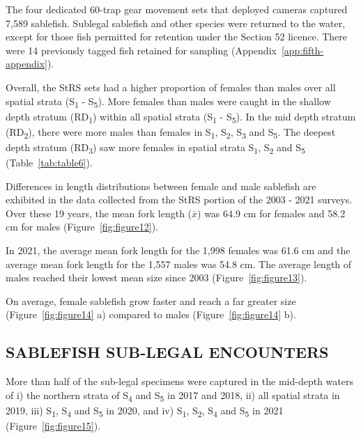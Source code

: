 \documentclass[12pt]{article}\usepackage[]{graphicx}\usepackage[]{color}
\begin{document}
The four dedicated 60-trap gear movement sets that deployed cameras captured 7,589 sablefish. Sublegal sablefish and other species were returned to the water, except for those fish permitted for retention under the Section 52 licence. There were 14 previously tagged fish retained for sampling (Appendix~\ref{app:fifth-appendix}).

Overall, the StRS sets had a higher proportion of females than males over all spatial strata (S\textsubscript{1} - S\textsubscript{5}). More females than males were caught in the shallow depth stratum (RD\textsubscript{1}) within all spatial strata (S\textsubscript{1} - S\textsubscript{5}). In the mid depth stratum (RD\textsubscript{2}), there were more males than females in S\textsubscript{1}, S\textsubscript{2}, S\textsubscript{3} and S\textsubscript{5}. The deepest depth stratum (RD\textsubscript{3}) saw more females in spatial strata S\textsubscript{1}, S\textsubscript{2} and S\textsubscript{5} (Table~\ref{tab:table6}).

Differences in length distributions between female and male sablefish are exhibited in the data collected from the StRS portion of the 2003 - 2021 surveys. Over these 19 years, the mean fork length (\(\bar{x}\)) was 64.9 cm for females and 58.2 cm for males (Figure~\ref{fig:figure12}).

In 2021, the average mean fork length for the 1,998 females was 61.6 cm and the average mean fork length for the 1,557 males was 54.8 cm. The average length of males reached their lowest mean size since 2003 (Figure~\ref{fig:figure13}).

On average, female sablefish grow faster and reach a far greater size (Figure~\ref{fig:figure14} a) compared to males (Figure~\ref{fig:figure14} b).

\hypertarget{sablefish-sub-legal-encounters}{%
\subsection{SABLEFISH SUB-LEGAL ENCOUNTERS}\label{sablefish-sub-legal-encounters}}

More than half of the sub-legal specimens were captured in the mid-depth waters of i) the northern strata of S\textsubscript{4} and S\textsubscript{5} in 2017 and 2018, ii) all spatial strata in 2019, iii) S\textsubscript{1}, S\textsubscript{4} and S\textsubscript{5} in 2020, and iv) S\textsubscript{1}, S\textsubscript{2}, S\textsubscript{4} and S\textsubscript{5} in 2021 (Figure~\ref{fig:figure15}).
\end{document}
